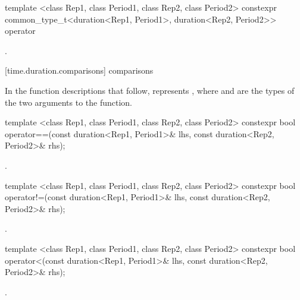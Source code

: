 %
\begin{itemdecl}
template <class Rep1, class Period1, class Rep2, class Period2>
  constexpr common_type_t<duration<Rep1, Period1>, duration<Rep2, Period2>>
  operator%
\end{itemdecl}

\begin{itemdescr}
\pnum
\returns {}.
\end{itemdescr}


[time.duration.comparisons]{ comparisons}

\pnum
In the function descriptions that follow,  represents
, where  and  are the types of
the two arguments to the function.

%
\begin{itemdecl}
template <class Rep1, class Period1, class Rep2, class Period2>
  constexpr bool operator==(const duration<Rep1, Period1>& lhs, const duration<Rep2, Period2>& rhs);
\end{itemdecl}

\begin{itemdescr}
\pnum
\returns {}.
\end{itemdescr}

%
\begin{itemdecl}
template <class Rep1, class Period1, class Rep2, class Period2>
  constexpr bool operator!=(const duration<Rep1, Period1>& lhs, const duration<Rep2, Period2>& rhs);
\end{itemdecl}

\begin{itemdescr}
\pnum
\returns {}.
\end{itemdescr}

%
\begin{itemdecl}
template <class Rep1, class Period1, class Rep2, class Period2>
  constexpr bool operator<(const duration<Rep1, Period1>& lhs, const duration<Rep2, Period2>& rhs);
\end{itemdecl}

\begin{itemdescr}
\pnum
\returns {}.
\end{itemdescr}

